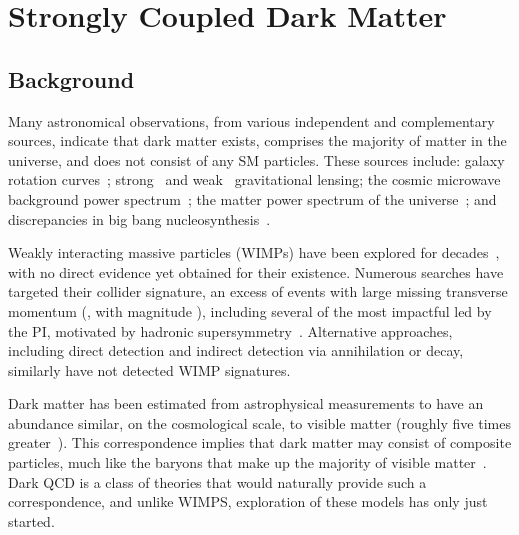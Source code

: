 \section{Strongly Coupled Dark Matter}\label{sec:darkqcd}

\subsection{Background}\label{subsec:dmbkg}

Many astronomical observations, from various independent and complementary sources,
indicate that dark matter exists, comprises the majority of matter in the universe, and does not consist of any SM particles.
These sources include:
galaxy rotation curves~\cite{Rubin:1980zd,Persic:1995ru,vanDokkum:2018vup,PinaMancera:2021wpc};
strong~\cite{Clowe:2006eq} and weak~\cite{Chang:2017kmv} gravitational lensing;
the cosmic microwave background power spectrum~\cite{Planck:2018vyg}; the matter power spectrum of the universe~\cite{Dodelson:2011qv,Planck:2018nkj};
and discrepancies in big bang nucleosynthesis~\cite{Pospelov:2010hj}.

Weakly interacting massive particles (WIMPs) have been explored for decades~\cite{Jungman:1995df}, with no direct evidence yet obtained for their existence.
Numerous searches have targeted their collider signature, an excess of events with large missing transverse momentum (\ptvecmiss, with magnitude \ptmiss),
including several of the most impactful led by the PI, motivated by hadronic supersymmetry~\cite{Khachatryan:2016kdk,Sirunyan:2017cwe,Sirunyan:2019hzr,Sirunyan:2019ctn,CMS:2023xlp}.
Alternative approaches, including direct detection and indirect detection via annihilation or decay, similarly have not detected WIMP signatures.

Dark matter has been estimated from astrophysical measurements to have an abundance similar,
on the cosmological scale, to visible matter (roughly five times greater~\cite{Ade:2015xua}).
This correspondence implies that dark matter may consist of composite particles, much like the baryons that make up the majority of visible matter~\cite{Bai:2013xga,Bodas:2024idn}.
Dark QCD is a class of theories that would naturally provide such a correspondence,
and unlike WIMPS, exploration of these models has only just started.

